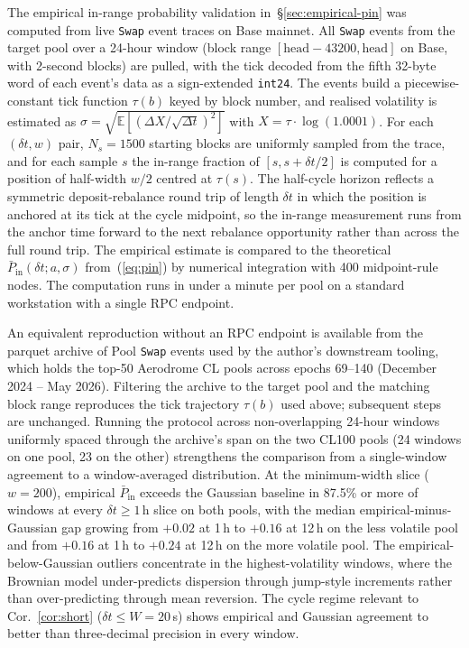\documentclass[11pt,a4paper]{article}
\theoremstyle{definition}
\theoremstyle{plain}
\theoremstyle{remark}
\begin{document}
The empirical in-range probability validation in~\S\ref{sec:empirical-pin} was computed from live \texttt{Swap} event traces on Base mainnet. All \texttt{Swap} events from the target pool over a 24-hour window (block range $[\text{head} - 43200, \text{head}]$ on Base, with 2-second blocks) are pulled, with the tick decoded from the fifth 32-byte word of each event's data as a sign-extended \texttt{int24}. The events build a piecewise-constant tick function $\tau(b)$ keyed by block number, and realised volatility is estimated as $\sigma = \sqrt{\mathbb{E}[(\Delta X / \sqrt{\Delta t})^2]}$ with $X = \tau \cdot \log(1.0001)$. For each $(\delta t, w)$ pair, $N_s = 1500$ starting blocks are uniformly sampled from the trace, and for each sample $s$ the in-range fraction of $[s, s + \delta t / 2]$ is computed for a position of half-width $w/2$ centred at $\tau(s)$. The half-cycle horizon reflects a symmetric deposit-rebalance round trip of length $\delta t$ in which the position is anchored at its tick at the cycle midpoint, so the in-range measurement runs from the anchor time forward to the next rebalance opportunity rather than across the full round trip. The empirical estimate is compared to the theoretical $\bar P_{\text{in}}(\delta t; a, \sigma)$ from~(\ref{eq:pin}) by numerical integration with 400 midpoint-rule nodes. The computation runs in under a minute per pool on a standard workstation with a single RPC endpoint.

An equivalent reproduction without an RPC endpoint is available from the parquet archive of Pool \texttt{Swap} events used by the author's downstream tooling, which holds the top-50 Aerodrome CL pools across epochs 69--140 (December 2024 -- May 2026). Filtering the archive to the target pool and the matching block range reproduces the tick trajectory $\tau(b)$ used above; subsequent steps are unchanged. Running the protocol across non-overlapping 24-hour windows uniformly spaced through the archive's span on the two CL100 pools (24 windows on one pool, 23 on the other) strengthens the comparison from a single-window agreement to a window-averaged distribution. At the minimum-width slice ($w = 200$), empirical $\bar P_{\text{in}}$ exceeds the Gaussian baseline in 87.5\% or more of windows at every $\delta t \geq 1$\,h slice on both pools, with the median empirical-minus-Gaussian gap growing from $+0.02$ at 1\,h to $+0.16$ at 12\,h on the less volatile pool and from $+0.16$ at 1\,h to $+0.24$ at 12\,h on the more volatile pool. The empirical-below-Gaussian outliers concentrate in the highest-volatility windows, where the Brownian model under-predicts dispersion through jump-style increments rather than over-predicting through mean reversion. The cycle regime relevant to Cor.~\ref{cor:short} ($\delta t \leq W = 20$\,s) shows empirical and Gaussian agreement to better than three-decimal precision in every window.
\end{document}
